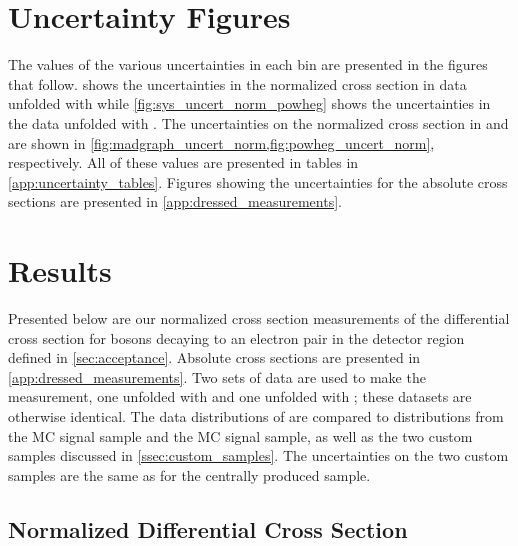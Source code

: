 \section{Uncertainty Figures}

The values of the various uncertainties in each \phistar bin are presented in
the figures that follow.  shows the uncertainties in
the normalized \phistar cross section in data unfolded with \MADGRAPH while
\cref{fig:sys_uncert_norm_powheg} shows the uncertainties in the data unfolded
with \PPsixZtwo. The uncertainties on the normalized \phistar cross section in
\MADGRAPH and \POWHEG are shown in
\cref{fig:madgraph_uncert_norm,fig:powheg_uncert_norm}, respectively. All of
these values are presented in tables in \cref{app:uncertainty_tables}. Figures
showing the uncertainties for the absolute \phistar cross sections are
presented in \cref{app:dressed_measurements}.










\section{Results}
\label{sec:results}

Presented below are our normalized cross section measurements of the
differential \phistar cross section for \Z bosons decaying to an electron pair
in the detector region defined in \cref{sec:acceptance}. Absolute cross
sections are presented in \cref{app:dressed_measurements}. Two sets of data
are used to make the measurement, one unfolded with \MADGRAPH and one unfolded
with \PPsixZtwo; these datasets are otherwise identical. The data distributions
of \phistar are compared to distributions from the \MADGRAPH MC signal sample
and the \PPsixZtwo MC signal sample, as well as the two custom \POWHEG samples
discussed in \cref{ssec:custom_samples}. The uncertainties on the two custom
\POWHEG samples are the same as for the centrally produced sample.

\subsection{Normalized Differential Cross Section}
\label{ssec:results_norm}

